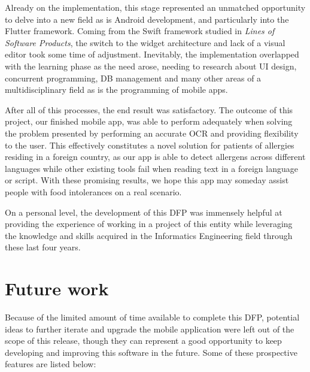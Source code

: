 Already on the implementation, this stage represented an unmatched opportunity to delve into a new field as is Android development, and particularly into the Flutter framework. Coming from the Swift framework studied in \textit{Lines of Software Products}, the switch to the widget architecture and lack of a visual editor took some time of adjustment. Inevitably, the implementation overlapped with the learning phase as the need arose, needing to research about UI design, concurrent programming, DB management and many other areas of a multidisciplinary field as is the programming of mobile apps.

After all of this processes, the end result was satisfactory. The outcome of this project, our finished mobile app, was able to perform adequately when solving the problem presented by performing an accurate OCR and providing flexibility to the user. This effectively constitutes a novel solution for patients of allergies residing in a foreign country, as our app is able to detect allergens across different languages while other existing tools fail when reading text in a foreign language or script. With these promising results, we hope this app may someday assist people with food intolerances on a real scenario.

On a personal level, the development of this DFP was immensely helpful at providing the experience of working in a project of this entity while leveraging the knowledge and skills acquired in the Informatics Engineering field through these last four years.

\section{Future work}

Because of the limited amount of time available to complete this DFP, potential ideas to further iterate and upgrade the mobile application were left out of the scope of this release, though they can represent a good opportunity to keep developing and improving this software in the future. Some of these prospective features are listed below:


